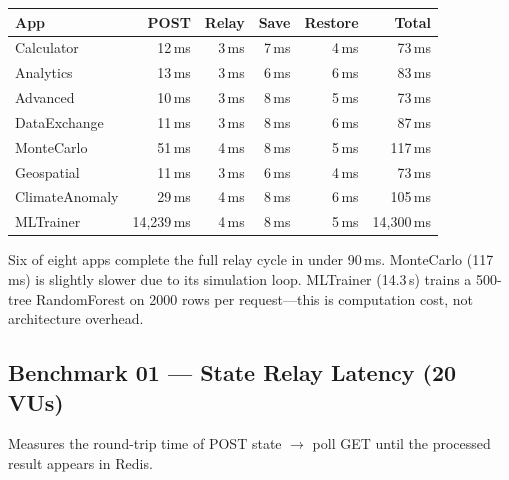 \documentclass[11pt,a4paper]{article}
\begin{document}
\begin{center}
\begin{tabular}{lrrrrr}
\toprule
\textbf{App} & \textbf{POST} & \textbf{Relay} & \textbf{Save} & \textbf{Restore} & \textbf{Total} \\
\midrule
Calculator     &   12\,ms &  3\,ms &  7\,ms &  4\,ms &    73\,ms \\
Analytics      &   13\,ms &  3\,ms &  6\,ms &  6\,ms &    83\,ms \\
Advanced       &   10\,ms &  3\,ms &  8\,ms &  5\,ms &    73\,ms \\
DataExchange   &   11\,ms &  3\,ms &  8\,ms &  6\,ms &    87\,ms \\
MonteCarlo     &   51\,ms &  4\,ms &  8\,ms &  5\,ms &   117\,ms \\
Geospatial     &   11\,ms &  3\,ms &  6\,ms &  4\,ms &    73\,ms \\
ClimateAnomaly &   29\,ms &  4\,ms &  8\,ms &  6\,ms &   105\,ms \\
MLTrainer      & 14,239\,ms &  4\,ms &  8\,ms &  5\,ms & 14,300\,ms \\
\bottomrule
\end{tabular}
\end{center}

\noindent Six of eight apps complete the full relay cycle in under
90\,ms. MonteCarlo (117\,ms) is slightly slower due to its simulation
loop. MLTrainer (14.3\,s) trains a 500-tree RandomForest on 2000 rows
per request---this is computation cost, not architecture overhead.

\subsection{Benchmark 01 — State Relay Latency (20 VUs)}

Measures the round-trip time of POST state $\to$ poll GET until the
processed result appears in Redis.
\end{document}
